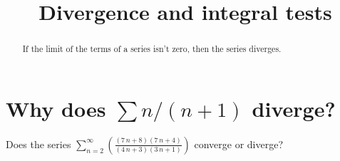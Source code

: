 \documentclass{ximera}
\title{Divergence and integral tests}
\begin{document}
\begin{abstract}
  If the limit of the terms of a series isn't zero, then the series diverges.
\end{abstract}

\maketitle

\section{Why does $\sum n/(n+1)$ diverge?}


\begin{question}
  Does the series \(\displaystyle\sum_{n=2}^\infty \left( \displaystyle\frac{ { \left(7 \, n + 8\right) } { \left(7 \, n + 4\right) } }{ {\left(4 \, n + 3\right)} {\left(3 \, n + 1\right)} } \right)\) converge or diverge?


\end{question}
\end{document}
